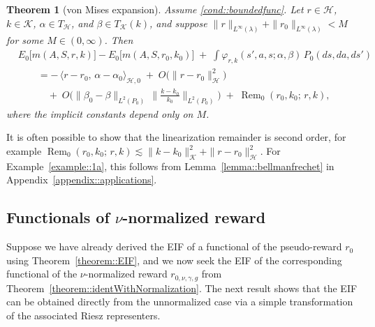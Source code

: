 \documentclass[12pt]{article}
\theoremstyle{plain}
\newtheorem{theorem}{Theorem}
\begin{document}
\begin{theorem}[von Mises expansion]
\label{theorem::vonmises}
Assume \ref{cond::boundedfunc}. Let $r \in \mathcal{H}$, $k \in \mathcal{K}$, 
$\alpha \in T_{\mathcal{H}}$, and $\beta \in T_{\mathcal{K}}(k)$, and suppose 
$\|r\|_{L^\infty(\lambda)} + \|r_0\|_{L^\infty(\lambda)} < M$ for some 
$M \in (0,\infty)$. Then
\begin{align*}
&E_0\!\big[m(A,S,r,k)\big] - E_0\!\big[m(A,S,r_0,k_0)\big] 
\;+\; \int \varphi_{r,k}(s',a,s;\alpha,\beta)\, P_0(ds,da,ds') \\
&\qquad
= -\,\langle r - r_0,\, \alpha - \alpha_0 \rangle_{\mathcal{H}, 0}
\;+\; O\!\big(\|r - r_0\|_{\mathcal{H}}^{2}\big) \\
&\qquad\quad
+\; O\!\Big(
      \|\beta_0 - \beta\|_{L^2(P_0)}
      \,\Big\|\tfrac{k - k_0}{k_0}\Big\|_{L^2(P_0)}
    \Big)
\;+\; \operatorname{Rem}_0(r_0,k_0;\,r,k),
\end{align*}
where the implicit constants depend only on $M$.
\end{theorem}
\noindent It is often possible to show that the linearization remainder is second order,
for example $\operatorname{Rem}_0(r_0,k_0;\,r,k)
\lesssim
\|k - k_0\|_{\mathcal{K}}^{2} + \|r - r_0\|_{\mathcal{H}}^{2}.$ For Example~\ref{example::1a}, this follows from Lemma~\ref{lemma::bellmanfrechet} in Appendix~\ref{appendix::applications}.

 



\subsection{Functionals of \texorpdfstring{$\nu$}{nu}-normalized reward}
\label{sec::eifnorm}
Suppose we have already derived the EIF of a functional of the pseudo-reward $r_0$ using Theorem~\ref{theorem::EIF}, and we now seek the EIF of the corresponding functional of the $\nu$-normalized reward $r_{0,\nu,\gamma,g}$ from Theorem~\ref{theorem::identWithNormalization}.  
The next result shows that the EIF can be obtained directly from the unnormalized case via a simple transformation of the associated Riesz representers.
\end{document}
